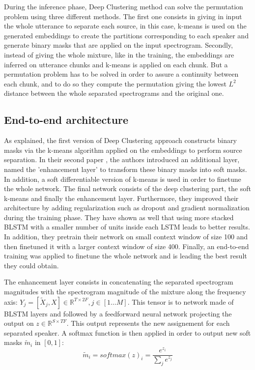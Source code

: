 \documentclass[master, tikz, final,11pt, dvipdfmx]{iscs-thesis}
\begin{document}
During the inference phase, Deep Clustering method can solve the permutation problem using three different methods. The first one consists in giving in input the whole utterance to separate each source, in this case, k-means is used on the generated embeddings to create the partitions corresponding to each speaker and generate binary masks that are applied on the input spectrogram. Secondly, instead of giving the whole mixture, like in the training, the embeddings are inferred on utterance chunks and k-means is applied on each chunk. But a permutation problem has to be solved in order to assure a continuity between each chunk, and to do so they compute the permutation giving the lowest $L^2$ distance between the whole separated spectrograms and the original one.

\subsection{End-to-end architecture}
\label{EEA}

As explained, the first version of Deep Clustering \cite{DPCLV1} approach constructs binary masks via the k-means algorithm applied on the embeddings to perform source separation. In their second paper \cite{DPCLV2}, the authors introduced an additional layer, named the 'enhancement layer' to transform these binary masks into soft masks. In addition, a soft differentiable version of k-means is used in order to finetune the whole network. The final network consists of the deep clustering part, the soft k-means and finally the enhancement layer.
Furthermore, they improved their architecture by adding regularization such as dropout and gradient normalization during the training phase. They have shown as well that using more stacked BLSTM with a smaller number of units inside each LSTM leads to better results.
In addition, they pretrain their network on small context window of size 100 and then finetuned it with a larger context window of size 400. Finally, an end-to-end training was applied to finetune the whole network and is leading the best result they could obtain.

The enhancement layer consists in concatenating the separated spectrogram magnitudes with the spectrogram magnitude of the mixture along the frequency axis: $Y_j = [\tilde X_j, X] \in \mathbb{R}^{T\times 2F}, j \in [1\dots M]$.
 This tensor is to network made of BLSTM layers and followed by a feedforward neural network projecting the output on $z \in \mathbb{R}^{S\times TF}$. This output represents the new assignement for each separated speaker. A softmax function is then applied in order to output new soft masks $\tilde m_i$ in $[0,1]$:
\[
\tilde m_i = softmax(z)_i  = \frac{e^{z_i}}{\sum_j{e^{z_j}}} 
\]
\end{document}
